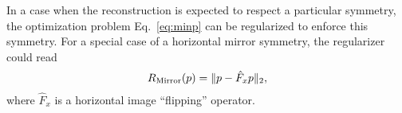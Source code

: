 \documentclass{article}
\def\Img{p}
\def\Reg{R}
\def\RegM{\Reg_{\rm Mirror}}
\newcommand{\op}[1]{\hat{#1}}
\def\MirrorOp{\op{F}_x}
\newcommand{\Eq}[1]{Eq.~\eqref{#1}}
\begin{document}
{    In a case when the reconstruction is expected to respect a particular symmetry, the optimization problem \Eq{eq:minp} can be regularized to enforce this symmetry.
    For a special case of a horizontal mirror symmetry, the regularizer could read
    \begin{equation*}
      \RegM(\Img) = \| \Img - \MirrorOp \Img\|_2,
    \end{equation*}
    where $\MirrorOp$ is a horizontal image ``flipping'' operator.
}
\end{document}
